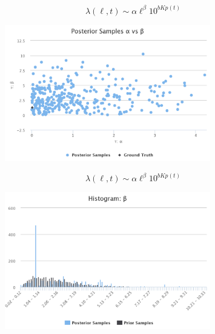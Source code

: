 \documentclass{beamer}
\begin{document}
\begin{frame}
  \begin{equation*}
    \lambda(\ell, t) \sim \alpha \ell^{\beta} 10^{b Kp(t)}
  \end{equation*}
  
\begin{figure}[h]
  \includegraphics[width=0.8\textwidth]{samples2_ex1.png}
  \label{fig:Samples2Ex1}
\end{figure}
\end{frame}

\begin{frame}
  \begin{equation*}
    \lambda(\ell, t) \sim \alpha \ell^{\beta} 10^{b Kp(t)}
  \end{equation*}
  
  \begin{figure}[h]
  \includegraphics[width=0.8\textwidth]{hist_ex1.png}
  \label{fig:HistEx1}
\end{figure}
\end{frame}
\end{document}
